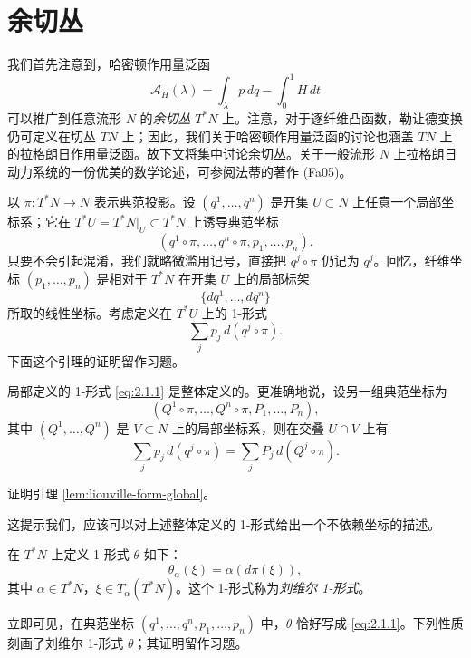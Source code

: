\section{余切丛}
\label{sec:cotangent-bundle}

我们首先注意到，哈密顿作用量泛函
\[
  \mathcal A_H(\lambda)
  =\int_\lambda p\,dq-\int_0^1 H\,dt
\]
可以推广到任意流形 $N$ 的\emph{余切丛} $T^*N$ 上。注意，对于逐纤维凸函数，勒让德变换仍可定义在切丛 $TN$ 上；因此，我们关于哈密顿作用量泛函的讨论也涵盖 $TN$ 上的拉格朗日作用量泛函。故下文将集中讨论余切丛。关于一般流形 $N$ 上拉格朗日动力系统的一份优美的数学论述，可参阅法蒂的著作 (Fa05)。

以 $\pi:T^*N\longrightarrow N$ 表示典范投影。设 $(q^1,\ldots,q^n)$ 是开集 $U\subset N$ 上任意一个局部坐标系；它在
$T^*U=T^*N|_U\subset T^*N$ 上诱导典范坐标
\[
  (q^1\circ\pi,\ldots,q^n\circ\pi,p_1,\ldots,p_n).
\]
只要不会引起混淆，我们就略微滥用记号，直接把 $q^j\circ\pi$ 仍记为 $q^j$。回忆，纤维坐标 $(p_1,\ldots,p_n)$ 是相对于 $T^*N$ 在开集 $U$ 上的局部标架
\[
  \{dq^1,\ldots,dq^n\}
\]
所取的线性坐标。考虑定义在 $T^*U$ 上的 1-形式
\begin{equation}
  \sum_j p_j\,d(q^j\circ\pi).
  \label{eq:2.1.1}
\end{equation}
下面这个引理的证明留作习题。

\begin{lemma}
\label{lem:liouville-form-global}
局部定义的 1-形式 \eqref{eq:2.1.1} 是整体定义的。更准确地说，设另一组典范坐标为
\[
  (Q^1\circ\pi,\ldots,Q^n\circ\pi,P_1,\ldots,P_n),
\]
其中 $(Q^1,\ldots,Q^n)$ 是 $V\subset N$ 上的局部坐标系，则在交叠 $U\cap V$ 上有
\[
  \sum_j p_j\,d(q^j\circ\pi)
  =\sum_j P_j\,d(Q^j\circ\pi).
\]
\end{lemma}

\begin{exercise}
证明引理 \ref{lem:liouville-form-global}。
\end{exercise}

这提示我们，应该可以对上述整体定义的 1-形式给出一个不依赖坐标的描述。

\begin{definition}[刘维尔 1-形式]
\label{def:liouville-one-form}
在 $T^*N$ 上定义 1-形式 $\theta$ 如下：
\[
  \theta_\alpha(\xi)=\alpha(d\pi(\xi)),
\]
其中 $\alpha\in T^*N$，$\xi\in T_\alpha(T^*N)$。这个 1-形式称为\emph{刘维尔 1-形式}。
\end{definition}

立即可见，在典范坐标 $(q^1,\ldots,q^n,p_1,\ldots,p_n)$ 中，$\theta$ 恰好写成 \eqref{eq:2.1.1}。下列性质刻画了刘维尔 1-形式 $\theta$；其证明留作习题。

